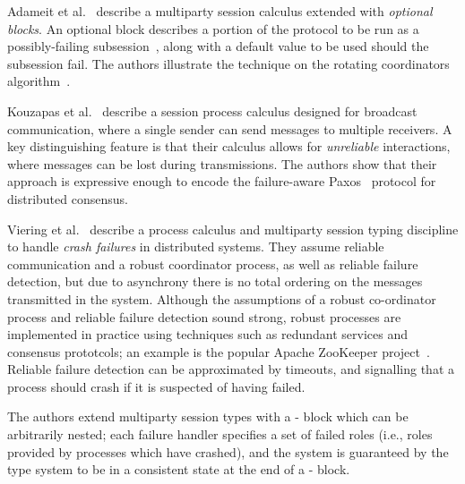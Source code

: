 \documentclass[
graybox,
envcountchap
]{svmult}
\begin{document}
\begin{bibunit}
  Adameit et al.~\cite{AdameitPN17:link-failures} describe a multiparty session
  calculus extended with \emph{optional blocks}. An optional block describes a
  portion of the protocol to be run as a possibly-failing
  subsession~\cite{DemangeonH12:subsessions}, along with a default value to be
  used should the subsession fail. The authors illustrate the technique on the
  rotating coordinators algorithm~\cite{Tel00:dist-algorithms}.


  Kouzapas et al.~\cite{KouzapasGVG19:async-broadcast} describe a session
  process calculus designed for broadcast communication, where a single sender
  can send messages to multiple
  receivers. A key distinguishing feature is that their calculus allows for
  \emph{unreliable} interactions, where messages can be lost during
  transmissions. The authors show that their approach is expressive enough to
  encode the failure-aware Paxos~\cite{Lamport98:paxos} protocol for distributed
  consensus.

  Viering et al.~\cite{VieringCEHZ18:crash-handling} describe a process calculus
  and multiparty session typing discipline to handle \emph{crash failures} in
  distributed systems. They assume reliable communication and a robust
  coordinator process, as well as reliable failure detection, but due to
  asynchrony there is no total ordering on the messages transmitted in the
  system.
%
  Although the assumptions of a robust co-ordinator process and reliable failure
  detection sound strong, robust processes are implemented in practice using
  techniques such as redundant services and consensus prototcols; an example is
  the popular Apache ZooKeeper project~\cite{JunqueiraR13:zookeeper}. Reliable
  failure detection can be approximated by timeouts, and signalling that a
  process should crash if it is suspected of having failed.

  The authors extend multiparty session types with a
  - block which can be arbitrarily nested; each failure
  handler specifies a set of failed roles (i.e., roles provided by processes
  which have crashed), and the system is guaranteed by the type system to be in
  a consistent state at the end of a - block.


\end{bibunit}
\end{document}
